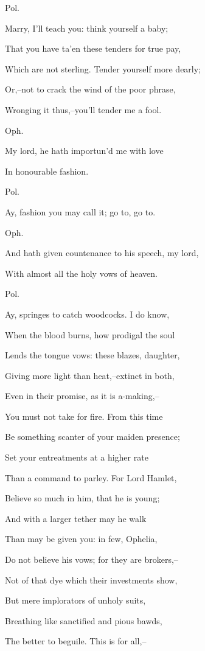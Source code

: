 \documentclass[12pt]{book}
\begin{document}
Pol.

Marry, I'll teach you: think yourself a baby;

That you have ta'en these tenders for true pay,

Which are not sterling. Tender yourself more dearly;

Or,--not to crack the wind of the poor phrase,

Wronging it thus,--you'll tender me a fool.



Oph.

My lord, he hath importun'd me with love

In honourable fashion.



Pol.

Ay, fashion you may call it; go to, go to.



Oph.

And hath given countenance to his speech, my lord,

With almost all the holy vows of heaven.



Pol.

Ay, springes to catch woodcocks. I do know,

When the blood burns, how prodigal the soul

Lends the tongue vows: these blazes, daughter,

Giving more light than heat,--extinct in both,

Even in their promise, as it is a-making,--

You must not take for fire. From this time

Be something scanter of your maiden presence;

Set your entreatments at a higher rate

Than a command to parley. For Lord Hamlet,

Believe so much in him, that he is young;

And with a larger tether may he walk

Than may be given you: in few, Ophelia,

Do not believe his vows; for they are brokers,--

Not of that dye which their investments show,

But mere implorators of unholy suits,

Breathing like sanctified and pious bawds,

The better to beguile. This is for all,--
\end{document}
